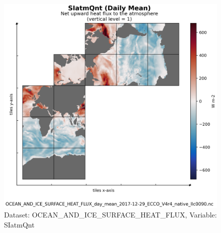\begin{figure}[H]
\centering
\includegraphics[scale=0.55]{../images/plots/v4r4/native_plots/Ocean_and_Sea-Ice_Surface_Heat_Fluxes/SIatmQnt.png}
\caption{Dataset: OCEAN\_AND\_ICE\_SURFACE\_HEAT\_FLUX, Variable: SIatmQnt}
\label{tab:table-OCEAN_AND_ICE_SURFACE_HEAT_FLUX_SIatmQnt-Plot}
\end{figure}
\newpage
\pagebreak
